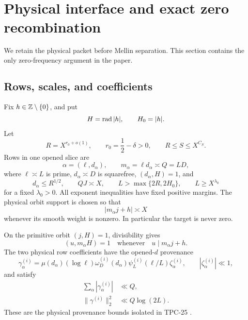 \section{Physical interface and exact zero recombination}
\label{sec:tpc28-interface-zero}

We retain the physical packet before Mellin separation.  This section
contains the only zero-frequency argument in the paper.

\subsection{Rows, scales, and coefficients}

Fix $h\in\mathbb Z\setminus\{0\}$, and put
\begin{equation}
 H=\operatorname{rad}|h|,\qquad H_0=|h|.
 \label{eq:tpc28-H-H0}
\end{equation}
Let
\begin{equation}
 R=X^{r_0+o(1)},\qquad r_0=\frac12-\delta>0,
 \qquad R\le S\le X^{C_S}.
 \label{eq:tpc28-RS}
\end{equation}
Rows in one opened slice are
\begin{equation}
 \alpha=(\ell,d_\alpha),\qquad
 m_\alpha=\ell d_\alpha\asymp Q=LD,
 \label{eq:tpc28-row-index}
\end{equation}
where $\ell\asymp L$ is prime,
$d_\alpha\asymp D$ is squarefree,
$(d_\alpha,H)=1$, and
\begin{equation}
 d_\alpha\le R^{1/2},\qquad
 QJ\asymp X,\qquad
 L>\max\{2R,2H_0\},\qquad
 L\ge X^{\lambda_0}
 \label{eq:tpc28-row-scales}
\end{equation}
for a fixed $\lambda_0>0$.  All exponent inequalities have fixed
positive margins.  The physical orbit support is chosen so that
\begin{equation}
 |m_\alpha j+h|\asymp X
 \label{eq:tpc28-target-support}
\end{equation}
whenever its smooth weight is nonzero.  In particular the target is
never zero.

On the primitive orbit $(j,H)=1$, divisibility gives
\begin{equation}
 (u,m_\alpha H)=1
 \quad\text{whenever}\quad u\mid m_\alpha j+h.
 \label{eq:tpc28-target-primitivity}
\end{equation}
The two physical row coefficients have the opened-$d$ provenance
\begin{equation}
 \gamma_\alpha^{(i)}
 =\mu(d_\alpha)(\log\ell)\omega_D^{(i)}(d_\alpha)
 \psi_L^{(i)}(\ell/L)\zeta_\alpha^{(i)},
 \qquad |\zeta_\alpha^{(i)}|\ll1,
 \label{eq:tpc28-row-provenance}
\end{equation}
and satisfy
\begin{align}
 \sum_\alpha|\gamma_\alpha^{(i)}|&\ll Q,
 \label{eq:tpc28-row-l1}\\
 \|\gamma^{(i)}\|_2^2&\ll Q\log(2L).
 \label{eq:tpc28-row-l2}
\end{align}
These are the physical provenance bounds isolated in TPC-25
\citep{WangTPC25}.

